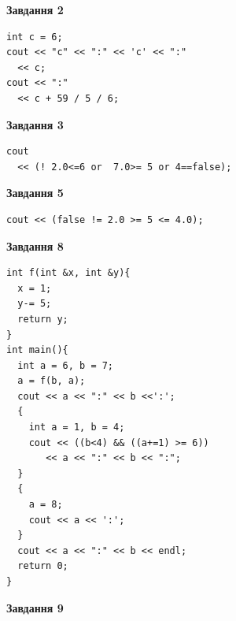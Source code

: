 \documentclass[12pt, ukrainian]{article}
\begin{document}
{\begin {large}
\begin{minipage}[t]{7.0cm}
\end{minipage}
\vline \hspace{1mm}
\begin{minipage}[t]{11.0cm}

\begin{center}
\textbf{Завдання 2}
\end{center}
\vspace{-8mm}

\begin{verbatim}
int c = 6;
cout << "c" << ":" << 'c' << ":" 
  << c;
cout << ":" 
  << c + 59 / 5 / 6;
\end{verbatim}



\begin{center}
\textbf{Завдання 3}
\end{center}
\vspace{-8mm}

\begin{verbatim}
cout 
  << (! 2.0<=6 or  7.0>= 5 or 4==false);
\end{verbatim}



\begin{center}
\textbf{Завдання 5}
\end{center}
\vspace{-8mm}

\begin{verbatim}
cout << (false != 2.0 >= 5 <= 4.0);
\end{verbatim}



\begin{center}
\textbf{Завдання 8}
\end{center}
\vspace{-8mm}

\begin{verbatim}
int f(int &x, int &y){
  x = 1;
  y-= 5;
  return y;
}
int main(){
  int a = 6, b = 7;
  a = f(b, a);
  cout << a << ":" << b <<':';
  {
    int a = 1, b = 4;
    cout << ((b<4) && ((a+=1) >= 6))
       << a << ":" << b << ":";
  }
  {
    a = 8;
    cout << a << ':';
  }
  cout << a << ":" << b << endl;
  return 0;
}
\end{verbatim}

\end{minipage}


\begin{minipage}[t]{7.0cm}

\begin{center}
\textbf{Завдання 9}
\end{center}
\vspace{-8mm}


\end{minipage}
\end{large}}
\end{document}
